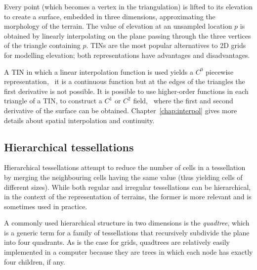 %

Every point (which becomes a vertex in the triangulation) is lifted to its elevation to create a surface, embedded in three dimensions, approximating the morphology of the terrain.
The value of elevation at an unsampled location $p$ is obtained by linearly interpolating on the plane passing through the three vertices of the triangle containing $p$. 
TINs are the most popular alternatives to 2D grids for modelling elevation; both representations have advantages and disadvantages.

%
 
A TIN in which a linear interpolation function is used yields a $C^0$ piecewise representation, \ie\ it is a continuous function but at the edges of the triangles the first derivative is not possible.
It is possible to use higher-order functions in each triangle of a TIN, to construct a $C^1$ or $C^2$ field, \ie\ where the first and second derivative of the surface can be obtained. 
Chapter~\ref{chap:interpol} gives more details about spatial interpolation and continuity.



\subsection{Hierarchical tessellations}

Hierarchical tessellations attempt to reduce the number of cells in a tessellation by merging the neighbouring cells having the same value (thus yielding cells of different sizes).
While both regular and irregular tessellations can be hierarchical, in the context of the representation of terrains, the former is more relevant and is sometimes used in practice.


%

A commonly used hierarchical structure in two dimensions is the \emph{quadtree}, which is a generic term for a family of tessellations that recursively subdivide the plane into four quadrants.%
As is the case for grids, quadtrees are relatively easily implemented in a computer because they are trees in which each node has exactly four children, if any.

